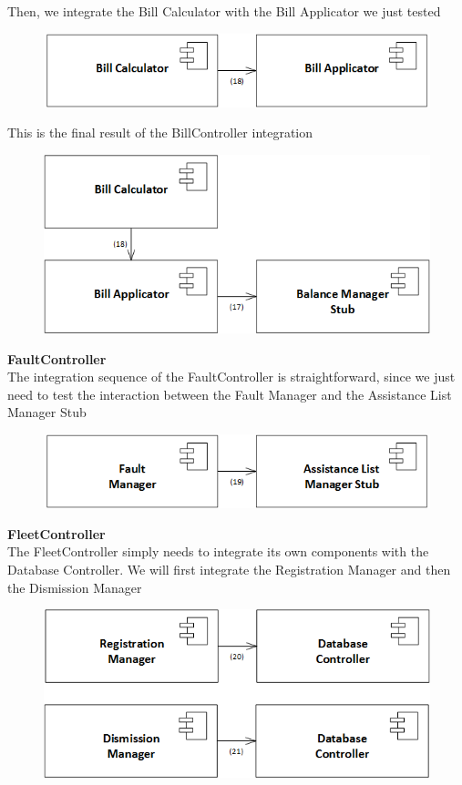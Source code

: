 \documentclass{article}
\begin{document}
Then, we integrate the Bill Calculator with the Bill Applicator we just tested
\begin{figure}[H]
\includegraphics[scale=0.5]{BillController/BillController2}
\centering
\end{figure}
This is the final result of the BillController integration
\begin{figure}[H]
\includegraphics[scale=0.5]{BillController/BillControllerFinal}
\centering
\end{figure}
\textbf{FaultController}
\\
The integration sequence of the FaultController is straightforward, since we just need to test the interaction between the Fault Manager and the Assistance List Manager Stub
\begin{figure}[H]
\includegraphics[scale=0.5]{FaultController/FaultController}
\centering
\end{figure}
\textbf{FleetController}
\\
The FleetController simply needs to integrate its own components with the Database Controller. We will first integrate the Registration Manager and then the Dismission Manager
\begin{figure}[H]
\includegraphics[scale=0.5]{FleetController/FleetController}
\centering
\end{figure}
\end{document}
